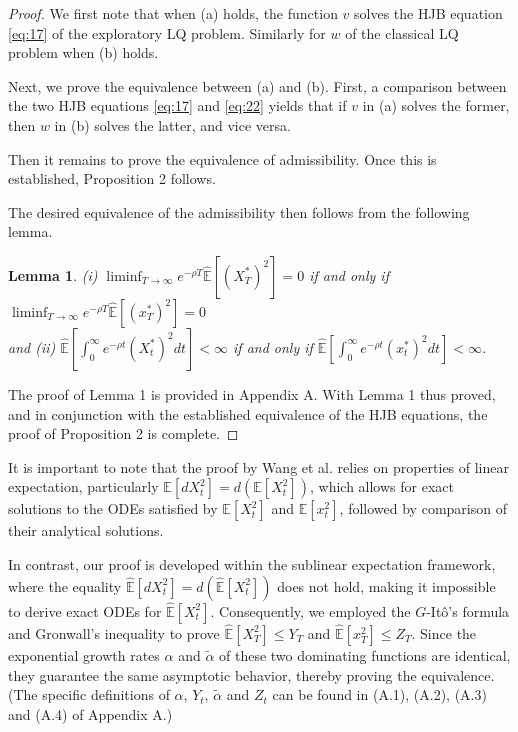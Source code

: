 \documentclass[onecolumn, journal]{IEEEtran} %
\newtheorem{lemma}{Lemma}
\begin{document}
	\begin{proof}
		We first note that when (a) holds, the function \(v\) solves the HJB equation \eqref{eq:17} of the exploratory LQ problem. Similarly for \(w\) of the classical LQ problem when (b) holds.
		
		Next, we prove the equivalence between (a) and (b). First, a comparison between the two HJB equations \eqref{eq:17} and \eqref{eq:22} yields that if \(v\) in (a) solves the former, then \(w\) in (b) solves the latter, and vice versa.
		
		Then it remains to prove the equivalence of admissibility. Once this is established, Proposition 2 follows.
		
		The desired equivalence of the admissibility then follows from the following lemma.
		\begin{lemma}
			(i) $\liminf_{T \to \infty} e^{-\rho T} \hat{\mathbb{E}}[(X_T^*)^2] = 0$ if and only if $\liminf_{T \to \infty} e^{-\rho T} \hat{\mathbb{E}}[(x_T^*)^2] = 0$ \\
			and (ii) $\hat{\mathbb{E}}\left[\int_0^\infty e^{-\rho t} (X_t^*)^2 dt\right] < \infty$ if and only if $\hat{\mathbb{E}}\left[\int_0^\infty e^{-\rho t} (x_t^*)^2 dt\right] < \infty$.
		\end{lemma}
		The proof of Lemma 1 is provided in Appendix A. With Lemma 1 thus proved, and in conjunction with the established equivalence of the HJB equations, the proof of Proposition 2 is complete.
	\end{proof}
	It is important to note that the proof by Wang et al. \cite{wang2020reinforcement} relies on properties of linear expectation, particularly $\mathbb{E}[dX_t^2] = d(\mathbb{E}[X_t^2])$, which allows for exact solutions to the ODEs satisfied by $\mathbb{E}[X_t^2]$ and $\mathbb{E}[x_t^2]$, followed by comparison of their analytical solutions.
	
	In contrast, our proof is developed within the sublinear expectation framework, where the equality $\hat{\mathbb{E}}[dX_t^2] = d(\hat{\mathbb{E}}[X_t^2])$ does not hold, making it impossible to derive exact ODEs for $\hat{\mathbb{E}}[X_t^2]$. Consequently, we employed the $G$-Itô's formula and Gronwall's inequality to prove $\hat{\mathbb{E}}[X_T^2] \leq Y_T$ and $\hat{\mathbb{E}}[x_T^2] \leq Z_T$. Since the exponential growth rates $\alpha$ and $\tilde{\alpha}$ of these two dominating functions are identical, they guarantee the same asymptotic behavior, thereby proving the equivalence. (The specific definitions of $\alpha$, $Y_t$, $\tilde{\alpha}$ and $Z_t$ can be found in (A.1), (A.2), (A.3) and (A.4) of Appendix A.)
	
\end{document}
